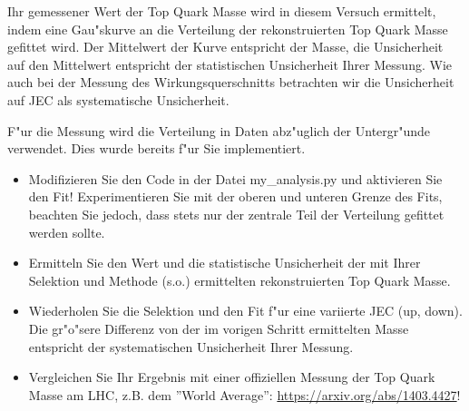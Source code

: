Ihr gemessener Wert der Top Quark Masse wird in diesem Versuch ermittelt, indem eine Gau"skurve an die Verteilung der rekonstruierten Top Quark Masse gefittet wird. Der Mittelwert der Kurve entspricht der Masse, die Unsicherheit auf den Mittelwert entspricht der statistischen Unsicherheit Ihrer Messung. Wie auch bei der Messung des Wirkungsquerschnitts betrachten wir die Unsicherheit auf JEC als systematische Unsicherheit. 

F"ur die Messung wird die Verteilung in Daten abz"uglich der Untergr"unde verwendet. Dies wurde bereits f"ur Sie implementiert.

\begin{itemize}
\item Modifizieren Sie den Code in der Datei my\_analysis.py und aktivieren Sie den Fit! Experimentieren Sie mit der oberen und unteren Grenze des Fits, beachten Sie jedoch, dass stets nur der zentrale Teil der Verteilung gefittet werden sollte.

\item Ermitteln Sie den Wert und die statistische Unsicherheit der mit Ihrer Selektion und Methode (s.o.) ermittelten rekonstruierten Top Quark Masse.

\item Wiederholen Sie die Selektion und den Fit f"ur eine variierte JEC (up, down). Die gr"o"sere Differenz von der im vorigen Schritt ermittelten Masse entspricht der systematischen Unsicherheit Ihrer Messung. 

\item Vergleichen Sie Ihr Ergebnis mit einer offiziellen Messung der Top Quark Masse am LHC, z.B. dem ''World Average'': \url{https://arxiv.org/abs/1403.4427}!
\end{itemize}